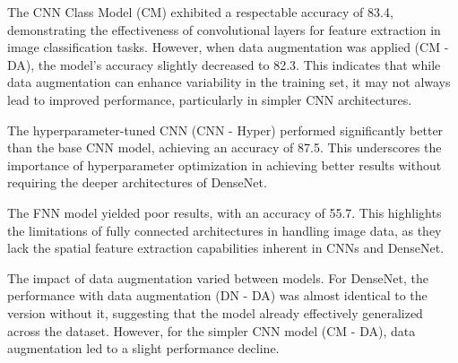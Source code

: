 The CNN Class Model (CM) exhibited a respectable accuracy of 83.4, demonstrating the effectiveness of convolutional layers for feature extraction in image classification tasks. However, when data augmentation was applied (CM - DA), the model's accuracy slightly decreased to 82.3. This indicates that while data augmentation can enhance variability in the training set, it may not always lead to improved performance, particularly in simpler CNN architectures.

The hyperparameter-tuned CNN (CNN - Hyper) performed significantly better than the base CNN model, achieving an accuracy of 87.5. This underscores the importance of hyperparameter optimization in achieving better results without requiring the deeper architectures of DenseNet.

The FNN model yielded poor results, with an accuracy of 55.7. This highlights the limitations of fully connected architectures in handling image data, as they lack the spatial feature extraction capabilities inherent in CNNs and DenseNet.

The impact of data augmentation varied between models. For DenseNet, the performance with data augmentation (DN - DA) was almost identical to the version without it, suggesting that the model already effectively generalized across the dataset. However, for the simpler CNN model (CM - DA), data augmentation led to a slight performance decline.